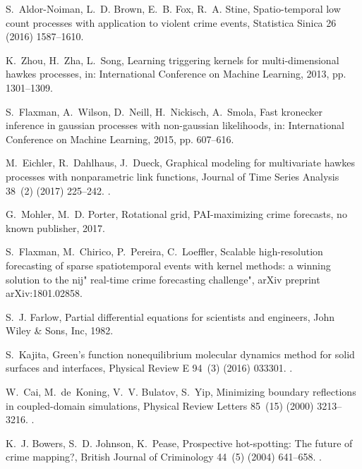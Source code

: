 \documentclass[review]{elsarticle}
\begin{document}
\begin{thebibliography}{10}
S.~Aldor-Noiman, L.~D. Brown, E.~B. Fox, R.~A. Stine, Spatio-temporal low count
  processes with application to violent crime events, Statistica Sinica 26
  (2016) 1587--1610.

K.~Zhou, H.~Zha, L.~Song, Learning triggering kernels for multi-dimensional
  hawkes processes, in: International Conference on Machine Learning, 2013, pp.
  1301--1309.

S.~Flaxman, A.~Wilson, D.~Neill, H.~Nickisch, A.~Smola, Fast kronecker
  inference in gaussian processes with non-gaussian likelihoods, in:
  International Conference on Machine Learning, 2015, pp. 607--616.

M.~Eichler, R.~Dahlhaus, J.~Dueck, Graphical modeling for multivariate hawkes
  processes with nonparametric link functions, Journal of Time Series Analysis
  38~(2) (2017) 225--242.
\newblock \href {http://dx.doi.org/10.1111/jtsa.12213}
  {}.

G.~Mohler, M.~D. Porter, Rotational grid, PAI-maximizing crime forecasts, no
  known publisher, 2017.

S.~Flaxman, M.~Chirico, P.~Pereira, C.~Loeffler, Scalable high-resolution
  forecasting of sparse spatiotemporal events with kernel methods: a winning
  solution to the nij" real-time crime forecasting challenge", arXiv preprint
  arXiv:1801.02858.

S.~J. Farlow, Partial differential equations for scientists and engineers, John
  Wiley \& Sons, Inc, 1982.


S.~Kajita, Green's function nonequilibrium molecular dynamics method for solid
  surfaces and interfaces, Physical Review E 94~(3) (2016) 033301.
\newblock \href {http://dx.doi.org/10.1103/PhysRevE.94.033301}
  {}.

W.~Cai, M.~de~Koning, V.~V. Bulatov, S.~Yip, Minimizing boundary reflections in
  coupled-domain simulations, Physical Review Letters 85~(15) (2000)
  3213--3216.
\newblock \href {http://dx.doi.org/10.1103/PhysRevLett.85.3213}
  {}.


K.~J. Bowers, S.~D. Johnson, K.~Pease, Prospective hot-spotting: The future of
  crime mapping?, British Journal of Criminology 44~(5) (2004) 641--658.
\newblock \href {http://dx.doi.org/10.1093/bjc/azh036}
  {}.


\end{thebibliography}
\end{document}
